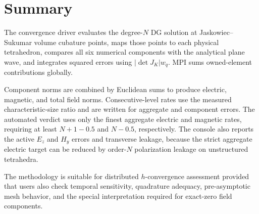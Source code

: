 \documentclass[11pt]{article}
\newcommand{\abs}[1]{\left| #1 \right|}
\begin{document}
\section{Summary}

The convergence driver evaluates the degree-\(N\) DG solution at
Jaskowiec--Sukumar volume cubature points, maps those points to each physical
tetrahedron, compares all six numerical components with the analytical plane
wave, and integrates squared errors using
\(\abs{\det J_K}w_q\). MPI sums owned-element contributions globally.

Component norms are combined by Euclidean sums to produce electric, magnetic,
and total field norms. Consecutive-level rates use the measured
characteristic-size ratio and are written for aggregate and component errors.
The automated verdict uses only the finest aggregate electric and magnetic
rates, requiring at least \(N+1-0.5\) and \(N-0.5\), respectively. The console
also reports the active \(E_z\) and \(H_y\) errors and transverse leakage,
because the strict aggregate electric target can be reduced by order-\(N\)
polarization leakage on unstructured tetrahedra.

The methodology is suitable for distributed \(h\)-convergence assessment
provided that users also check temporal sensitivity, quadrature adequacy,
pre-asymptotic mesh behavior, and the special interpretation required for
exact-zero field components.
\end{document}
